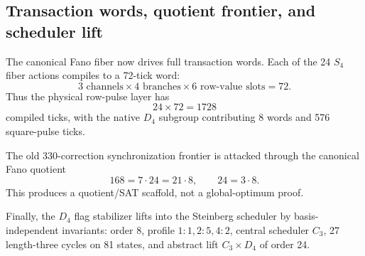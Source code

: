 \subsection{Transaction words, quotient frontier, and scheduler lift}
\label{sec:bt1495-bt1497-transaction-frontier-scheduler}

The canonical Fano fiber now drives full transaction words.  Each of the 24
\(S_4\) fiber actions compiles to a 72-tick word:
\[
3\text{ channels}\times4\text{ branches}\times6\text{ row-value slots}=72.
\]
Thus the physical row-pulse layer has
\[
24\times72=1728
\]
compiled ticks, with the native \(D_4\) subgroup contributing 8 words and 576
square-pulse ticks.

The old 330-correction synchronization frontier is attacked through the canonical
Fano quotient
\[
168=7\cdot24=21\cdot8,
\qquad
24=3\cdot8.
\]
This produces a quotient/SAT scaffold, not a global-optimum proof.

Finally, the \(D_4\) flag stabilizer lifts into the Steinberg scheduler by
basis-independent invariants: order 8, profile \(1:1,2:5,4:2\), central scheduler
\(C_3\), 27 length-three cycles on 81 states, and abstract lift
\(C_3\times D_4\) of order 24.
